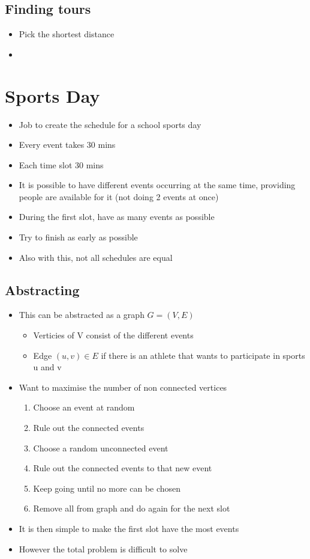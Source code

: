 \documentclass{article}[18pt]
\begin{document}
\subsection{Finding tours}
\begin{itemize}
\item Pick the shortest distance
\item 
\end{itemize}



\section{Sports Day}
\begin{itemize}
\item Job to create the schedule for a school sports day
\item Every event takes 30 mins
\item Each time slot 30 mins
\item It is possible to have different events occurring at the same time, providing people are available for it (not doing 2 events at once)
\item During the first slot, have as many events as possible
\item Try to finish as early as possible
\item Also with this, not all schedules are equal
\end{itemize}
\subsection{Abstracting}
\begin{itemize}
\item This can be abstracted as a graph $G=(V,E)$
\begin{itemize}
\item Verticies of V consist of the different events
\item Edge $(u,v)\in E$ if there is an athlete that wants to participate in sports u and v
\end{itemize}
\item Want to maximise the number of non connected vertices
\begin{enumerate}
\item Choose an event at random
\item Rule out the connected events
\item Choose a random unconnected event
\item Rule out the connected events to that new event
\item Keep going until no more can be chosen
\item Remove all from graph and do again for the next slot
\end{enumerate}
\item It is then simple to make the first slot have the most events
\item However the total problem is difficult to solve
\end{itemize}
\end{document}
